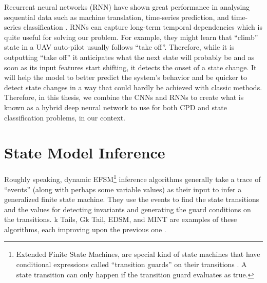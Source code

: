 Recurrent neural networks (RNN) have shown great performance in analysing sequential data such as machine translation, time-series prediction, and time-series classification \cite{cho2014learning, zhang2000predicting, wang2017time, murad2017deep, yang2015deep, Ordonez2016}. RNNs can capture long-term temporal dependencies which is quite useful for solving our problem. \cite{Che2018} For example, they might learn that ``climb'' state in a UAV auto-pilot usually follows ``take off''. Therefore, while it is outputting ``take off'' it anticipates what the next state will probably be and as soon as its input features start shifting, it detects the onset of a state change. It will help the model to better predict the system's behavior and be quicker to detect state changes in a way that could hardly be achieved with classic methods.
Therefore, in this thesis, we combine the CNNs and RNNs to create what is known as a hybrid deep neural network \cite{wang2017time} to use for both CPD and state classification problems, in our context.  











\section{State Model Inference}
Roughly speaking, dynamic EFSM\footnote{Extended Finite State Machines, are special kind of state machines that have conditional expressions called ``transition guards'' on their transitions \cite{lorenzoli2008automatic}. A state transition can only happen if the transition guard evaluates as true.} inference algorithms generally take a trace of ``events'' (along with perhaps some variable values) as their input \cite{walkinshaw2016inferring} to infer a generalized finite state machine. They use the events to find the state transitions and the values for detecting invariants and generating the guard conditions on the transitions. 
k Tails, Gk Tail, EDSM, and MINT are examples of these algorithms, each improving upon the previous one \cite{biermann1972synthesis, lorenzoli2008automatic, lang1998results, walkinshaw2016inferring}.  %

